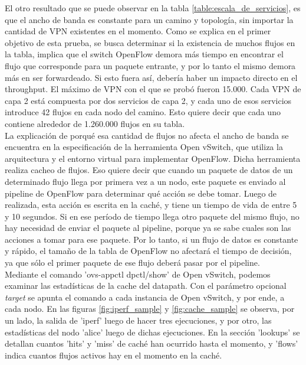 El otro resultado que se puede observar en la tabla \ref{table:escala_de_servicios}, es que el ancho de banda es constante para un camino y topología, sin importar la cantidad de VPN existentes en el momento. Como se explica en el primer objetivo de esta prueba, se busca determinar si la existencia de muchos flujos en la tabla, implica que el switch OpenFlow demora más tiempo en encontrar el flujo que corresponde para un paquete entrante, y por lo tanto el mismo demora más en ser forwardeado. Si esto fuera así, debería haber un impacto directo en el throughput. El máximo de VPN con el que se probó fueron 15.000. Cada VPN de capa 2 está compuesta por dos servicios de capa 2, y cada uno de esos servicios introduce 42 flujos en cada nodo del camino. Esto quiere decir que cada uno contiene alrededor de 1.260.000 flujos en su tabla. \\
La explicación de porqué esa cantidad de flujos no afecta el ancho de banda se encuentra en la especificación de la herramienta Open vSwitch, que utiliza la arquitectura y el entorno virtual para implementar OpenFlow. Dicha herramienta realiza cacheo de flujos. Eso quiere decir que cuando un paquete de datos de un determinado flujo llega por primera vez a un nodo, este paquete es enviado al pipeline de OpenFlow para determinar qué acción se debe tomar. Luego de realizada, esta acción es escrita en la caché, y tiene un tiempo de vida de entre 5 y 10 segundos. Si en ese período de tiempo llega otro paquete del mismo flujo, no hay necesidad de enviar el paquete al pipeline, porque ya se sabe cuales son las acciones a tomar para ese paquete. Por lo tanto, si un flujo de datos es constante y rápido, el tamaño de la tabla de OpenFlow no afectará el tiempo de decisión, ya que sólo el primer paquete de ese flujo deberá pasar por el pipeline. \\
Mediante el comando 'ovs-appctl dpctl/show' de Open vSwitch, podemos examinar las estadísticas de la cache del datapath. Con el parámetro opcional \textit{target} se apunta el comando a cada instancia de Open vSwitch, y por ende, a cada nodo. En las figuras \ref{fig:iperf_sample} y \ref{fig:cache_sample} se observa, por un lado, la salida de 'iperf' luego de hacer tres ejecuciones, y por otro, las estadísticas del nodo 'alice' luego de dichas ejecuciones. En la sección 'lookups' se detallan cuantos 'hits' y 'miss' de caché han ocurrido hasta el momento, y 'flows' indica cuantos flujos activos hay en el momento en la caché. \\ \\
